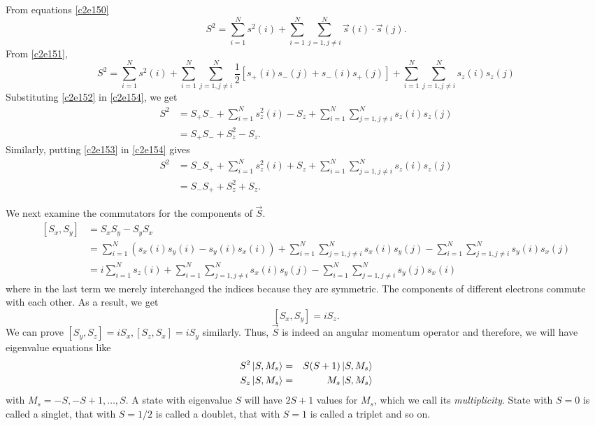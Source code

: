 From equations \eqref{c2e150}
\[
S^2 = \sum_{i=1}^Ns^2(i) + \sum_{i=1}^N\sum_{j=1,j\ne i}^N \vec{s}(i)\cdot
      \vec{s}(j).
\] 
From \eqref{c2e151},
\begin{equation}\label{c2e154}
S^2 = \sum_{i=1}^Ns^2(i) + 
\sum_{i=1}^N\sum_{j=1,j\ne i}^N \frac{1}{2}[s_+(i)s_-(j) + s_-(i)s_+(j)] 
+ \sum_{i=1}^N\sum_{j=1,j\ne i}^Ns_z(i)s_z(j)
\end{equation}
Substituting \eqref{c2e152} in \eqref{c2e154}, we get
\begin{equation}\label{c2e155}
\begin{aligned}
S^2 &= S_+S_- + \sum_{i=1}^Ns_z^2(i) - S_z + 
       \sum_{i=1}^N\sum_{j=1,j\ne i}^Ns_z(i)s_z(j) \\
 &= S_+S_- + S_z^2 - S_z.
\end{aligned}
\end{equation}
Similarly, putting \eqref{c2e153} in \eqref{c2e154} gives
\begin{equation}\label{c2e156}
\begin{aligned}
S^2 &= S_-S_+ + \sum_{i=1}^Ns_z^2(i) + S_z + 
       \sum_{i=1}^N\sum_{j=1,j\ne i}^Ns_z(i)s_z(j) \\
 &= S_-S_+ + S_z^2 + S_z.
\end{aligned}
\end{equation}

We next examine the commutators for the components of $\vec{S}$.
\[
\begin{aligned}
[S_x, S_y] &= S_xS_y - S_yS_x \\
 &= \sum_{i=1}^N(s_x(i)s_y(i) - s_y(i)s_x(i)) + \sum_{i=1}^N\sum_{j=1,j\ne i}^N
    s_x(i)s_y(j) - \sum_{i=1}^N\sum_{j=1,j\ne i}^Ns_y(i)s_x(j) \\
 &= i\sum_{i=1}^Ns_z(i) + \sum_{i=1}^N\sum_{j=1,j\ne i}^N
    s_x(i)s_y(j) - \sum_{i=1}^N\sum_{j=1,j\ne i}^Ns_y(j)s_x(i) 
\end{aligned}
\]
where in the last term we merely interchanged the indices because they are 
symmetric. The components of different electrons commute with each other. As
a result, we get
\begin{equation}\label{c2e157}
[S_x, S_y] = iS_z.
\end{equation}
We can prove $[S_y, S_z] = iS_x, [S_z, S_x] = iS_y$ similarly. Thus, $\vec{S}$
is indeed an angular momentum operator and therefore, we will have eigenvalue
equations like
\begin{eqnarray}
S^2\ket{S, M_s} &=& S(S + 1)\ket{S, M_s} \label{c2e158} \\
S_z\ket{S, M_s} &=& M_s\ket{S, M_s} \label{c2e159}
\end{eqnarray}
with $M_s = -S, -S + 1, \ldots, S$. A state with eigenvalue $S$ will have
$2S + 1$ values for $M_s$, which we call its \emph{multiplicity}. State with
$S = 0$ is called a singlet, that with $S=1/2$ is called a doublet, that
with $S = 1$ is called a triplet and so on.

